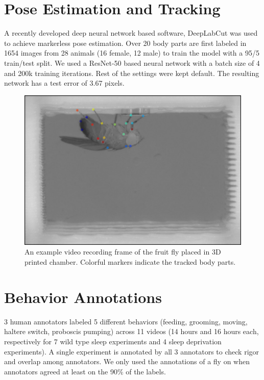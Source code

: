 \section{Pose Estimation and Tracking}
A recently developed deep neural network based software, DeepLabCut was used to achieve markerless pose estimation.
Over 20 body parts are first labeled in 1654 images from 28 animals (16 female, 12 male) to train the model with a 95/5 train/test split.
We used a ResNet-50 based neural network with a batch size of 4 and 200k training iterations.
Rest of the settings were kept default.
The resulting network has a test error of 3.67 pixels.

\begin{figure}[ht!]
	\centering
	\includegraphics[width=0.75\linewidth]{figures/FlyTrackedBodyParts.png}
	\caption[An example frame of the fruit fly placed in 3D printed chamber.] {An example video recording frame of the fruit fly placed in 3D printed chamber. Colorful markers indicate the tracked body parts.}
\end{figure}

\section{Behavior Annotations}

3 human annotators labeled 5 different behaviors (feeding, grooming, moving, haltere switch, proboscis pumping) across 11 videos (14 hours and 16 hours each, respectively for 7 wild type sleep experiments and 4 sleep deprivation experiments).
A single experiment is annotated by all 3 annotators to check rigor and overlap among annotators. We only used the annotations of a fly on when  annotators agreed at least on the 90\% of the labels.

